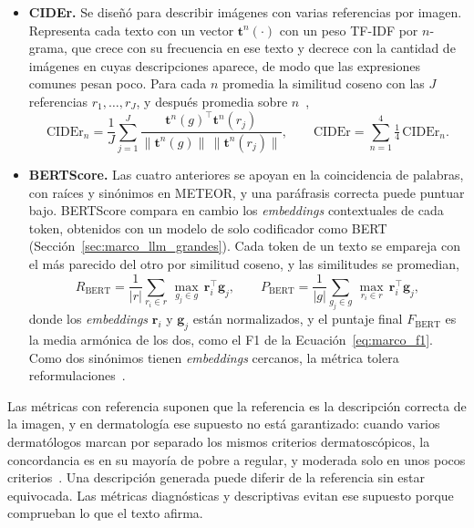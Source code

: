 \begin{itemize}
    \item \textbf{CIDEr.} Se diseñó para describir imágenes con varias referencias por imagen. Representa cada
    texto con un vector $\mathbf{t}^n(\cdot)$ con un peso TF-IDF por $n$-grama, que crece con su frecuencia en
    ese texto y decrece con la cantidad de imágenes en cuyas descripciones aparece, de modo que las expresiones
    comunes pesan poco. Para cada $n$ promedia la similitud coseno con las $J$ referencias $r_1, \dots, r_J$, y
    después promedia sobre $n$~\cite{vedantam2015cider},
    \begin{equation}
        \mathrm{CIDEr}_n = \frac{1}{J}\sum_{j=1}^{J}
        \frac{\mathbf{t}^n(g)^{\top}\mathbf{t}^n(r_j)}{\lVert\mathbf{t}^n(g)\rVert\,\lVert\mathbf{t}^n(r_j)\rVert},
        \qquad
        \mathrm{CIDEr} = \sum_{n=1}^{4} \tfrac{1}{4}\,\mathrm{CIDEr}_n.
        \label{eq:marco_cider}
    \end{equation}

    \item \textbf{BERTScore.} Las cuatro anteriores se apoyan en la coincidencia de palabras, con raíces y
    sinónimos en METEOR, y una paráfrasis correcta puede puntuar bajo. BERTScore compara en cambio los \emph{embeddings} contextuales de cada token, obtenidos con un
    modelo de solo codificador como BERT (Sección~\ref{sec:marco_llm_grandes}). Cada token de un texto se
    empareja con el más parecido del otro por similitud coseno, y las similitudes se promedian,
    \begin{equation}
        R_{\mathrm{BERT}} = \frac{1}{|r|}\sum_{r_i \in r}\,\max_{g_j \in g}\, \mathbf{r}_i^{\top}\mathbf{g}_j,
        \qquad
        P_{\mathrm{BERT}} = \frac{1}{|g|}\sum_{g_j \in g}\,\max_{r_i \in r}\, \mathbf{r}_i^{\top}\mathbf{g}_j,
        \label{eq:marco_bertscore}
    \end{equation}
    donde los \emph{embeddings} $\mathbf{r}_i$ y $\mathbf{g}_j$ están normalizados, y el puntaje final
    $F_{\mathrm{BERT}}$ es la media armónica de los dos, como el F1 de la Ecuación~\ref{eq:marco_f1}. Como dos
    sinónimos tienen \emph{embeddings} cercanos, la métrica tolera reformulaciones~\cite{zhang2020bertscore}.
\end{itemize}

Las métricas con referencia suponen que la referencia es la descripción correcta de la imagen, y en
dermatología ese supuesto no está garantizado: cuando varios dermatólogos marcan por separado los mismos
criterios dermatoscópicos, la concordancia es en su mayoría de pobre a regular, y moderada solo en unos pocos
criterios~\cite{carrera2016validity}. Una descripción
generada puede diferir de la referencia sin estar equivocada. Las métricas diagnósticas y descriptivas evitan
ese supuesto porque comprueban lo que el texto afirma.

